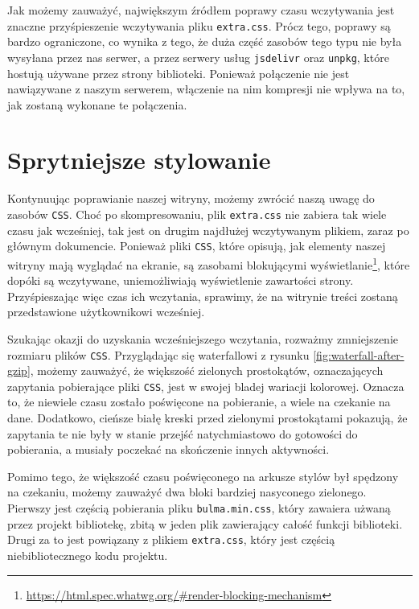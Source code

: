 \documentclass[licencjacka]{pracadypl}
\begin{document}
Jak możemy zauważyć, największym źródłem poprawy czasu wczytywania jest znaczne przyśpieszenie wczytywania pliku \texttt{extra.css}. Prócz tego, poprawy są bardzo ograniczone, co wynika z tego, że duża część zasobów tego typu nie była wysyłana przez nas serwer, a przez serwery usług \texttt{jsdelivr} oraz \texttt{unpkg}, które hostują używane przez strony biblioteki. Ponieważ połączenie nie jest nawiązywane z naszym serwerem, włączenie na nim kompresji nie wpływa na to, jak zostaną wykonane te połączenia.




\section{Sprytniejsze stylowanie}

Kontynuując poprawianie naszej witryny, możemy zwrócić naszą uwagę do zasobów \texttt{CSS}. Choć po skompresowaniu, plik \texttt{extra.css} nie zabiera tak wiele czasu jak wcześniej, tak jest on drugim najdłużej wczytywanym plikiem, zaraz po głównym dokumencie. Ponieważ pliki \texttt{CSS}, które opisują, jak elementy naszej witryny mają wyglądać na ekranie, są zasobami blokującymi wyświetlanie\footnote{\url{https://html.spec.whatwg.org/\#render-blocking-mechanism}}, które dopóki są wczytywane, uniemożliwiają wyświetlenie zawartości strony. Przyśpieszając więc czas ich wczytania, sprawimy, że na witrynie treści zostaną przedstawione użytkownikowi wcześniej.

Szukając okazji do uzyskania wcześniejszego wczytania, rozważmy zmniejszenie rozmiaru plików \texttt{CSS}. Przyglądając się waterfallowi z rysunku \ref{fig:waterfall-after-gzip}, możemy zauważyć, że większość zielonych prostokątów, oznaczających zapytania pobierające pliki \texttt{CSS}, jest w swojej bladej wariacji kolorowej. Oznacza to, że niewiele czasu zostało poświęcone na pobieranie, a wiele na czekanie na dane. Dodatkowo, cieńsze białę kreski przed zielonymi prostokątami pokazują, że zapytania te nie były w stanie przejść natychmiastowo do gotowości do pobierania, a musiały poczekać na skończenie innych aktywności. 

Pomimo tego, że większość czasu poświęconego na arkusze stylów był spędzony na czekaniu, możemy zauważyć dwa bloki bardziej nasyconego zielonego. Pierwszy jest częścią pobierania pliku \texttt{bulma.min.css}, który zawaiera użwaną przez projekt bibliotekę, zbitą w jeden plik zawierający całość funkcji biblioteki. Drugi za to jest powiązany z plikiem \texttt{extra.css}, który jest częścią niebibliotecznego kodu projektu.
\end{document}
